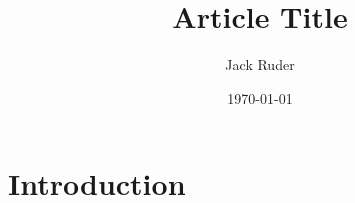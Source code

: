 \documentclass[11pt]{article}
\title{Article Title}
\author{Jack Ruder}
\date{\today}
\begin{document}
\maketitle

\section{Introduction}
\end{document}
